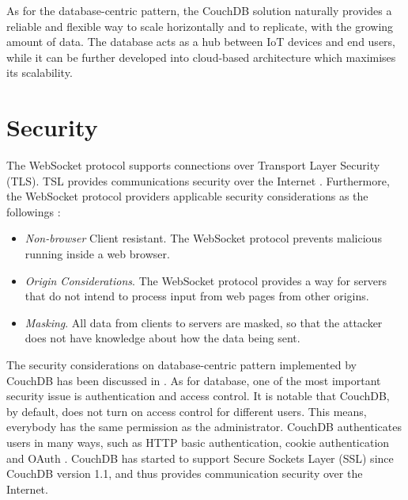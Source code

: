 As for the database-centric pattern, the CouchDB solution naturally provides a reliable and flexible way to scale horizontally and to replicate, with the growing amount of data. The database acts as a hub between IoT devices and end users, while it can be further developed into cloud-based architecture which maximises its scalability. 

\section{Security}
The WebSocket protocol supports connections over Transport Layer Security (TLS). TSL provides communications security over the Internet \cite{dierks2008rfc}. Furthermore, the WebSocket protocol providers applicable security considerations as the followings \cite{rfc64552012web}: 

\begin{itemize}
\setlength{\itemsep}{0pt}
\item \emph{Non-browser} Client resistant. The WebSocket protocol prevents malicious running inside a web browser. 
\item \emph{Origin Considerations}. The WebSocket protocol provides a way for servers that do not intend to process input from web pages from other origins.
\item \emph{Masking}. All data from clients to servers are masked, so that the attacker does not have knowledge about how the data being sent.
\end{itemize}

The security considerations on database-centric pattern implemented by CouchDB has been discussed in \cite{francesco2012storage}. As for database, one of the most important security issue is authentication and access control. It is notable that CouchDB, by default, does not turn on access control for different users. This means, everybody has the same permission as the administrator. CouchDB authenticates users in many ways, such as HTTP basic authentication, cookie authentication and OAuth \cite{hammer2010oauth}. CouchDB has started to support Secure Sockets Layer (SSL) since CouchDB version 1.1, and thus provides communication security over the Internet.

